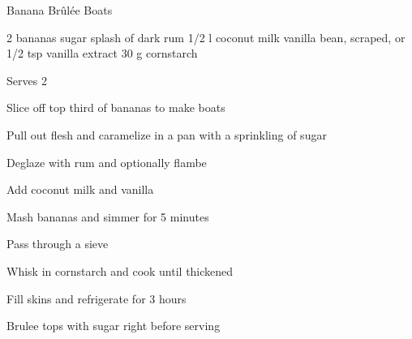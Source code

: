 \begin{denserecipe}{Banana Brûlée Boats}{\vegetarian{}}
\begin{ingredients}
2 bananas
sugar
splash of dark rum
1/2 l coconut milk
vanilla bean, scraped, or 1/2 tsp vanilla extract
30 g cornstarch
\end{ingredients}
\nextcolumn
Serves 2
\begin{steps}
    \item Slice off top third of bananas to make boats
    \item Pull out flesh and caramelize in a pan with a sprinkling of sugar
    \item Deglaze with rum and optionally flambe
    \item Add coconut milk and vanilla
    \item Mash bananas and simmer for 5 minutes
    \item Pass through a sieve
    \item Whisk in cornstarch and cook until thickened
    \item Fill skins and refrigerate for 3 hours
    \item Brulee tops with sugar right before serving
\end{steps}
\end{denserecipe}
